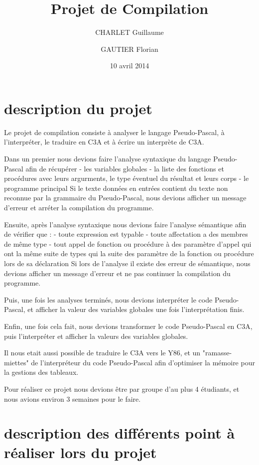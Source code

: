 ﻿\documentclass{report}
\title{Projet de Compilation}
\author{CHARLET Guillaume \and GAUTIER Florian}
\date{10 avril 2014}
\begin{document}
\maketitle

\tableofcontents

\chapter{description du projet}
Le projet de compilation consiste à analyser le langage Pseudo-Pascal, à l’interpréter, le traduire en C3A et à écrire un interprète de C3A.

Dans un premier nous devions faire l'analyse syntaxique du langage Pseudo-Pascal afin de récupérer 
	- les variables globales
	- la liste des fonctions et procédures avec leurs argurments, le type éventuel du résultat et leurs corps
	- le programme principal
Si le texte données en entrées contient du texte non reconnue par la grammaire du Pseudo-Pascal, nous devions afficher un message d'erreur et arréter la compilation du programme.

Ensuite, après l'analyse syntaxique nous devions faire l'analyse sémantique afin de vérifier que :
	- toute expression est typable
	- toute affectation a des membres de même type
	- tout appel de fonction ou procédure à des paramètre d'appel qui ont la même suite de types qui la suite des paramètre de la fonction ou procédure lors de sa déclaration
Si lors de l'analyse il existe des erreur de sémantique, nous devions afficher un message d'erreur et ne pas continuer la compilation du programme.

Puis, une fois les analyses terminés, nous devions interpréter le code Pseudo-Pascal, et afficher la valeur des variables globales une fois l'interprétation finis.

Enfin, une fois cela fait, nous devions transformer le code Pseudo-Pascal en C3A, puis l'interpréter et afficher la valeurs des variables globales.

Il nous etait aussi possible de traduire le C3A vers le Y86, et un "ramasse-miettes" de l'interpréteur du code Pseudo-Pascal afin d'optimiser la mémoire pour la gestions des tableaux.

Pour réaliser ce projet nous devions être par groupe d'au plus 4 étudiants, et nous avions environ 3 semaines pour le faire.

\chapter{description des différents point à réaliser lors du projet}
\end{document}
